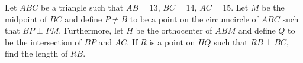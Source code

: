 Let $ABC$ be a triangle such that $AB=13$, $BC=14$, $AC=15$. Let $M$ be the midpoint of $BC$ and define $P\neq B$ to be a point on the circumcircle of $ABC$ such that $BP\perp PM$. Furthermore, let $H$ be the orthocenter of $ABM$ and define $Q$ to be the intersection of $BP$ and $AC$. If $R$ is a point on $HQ$ such that $RB\perp BC$, find the length of $RB$.